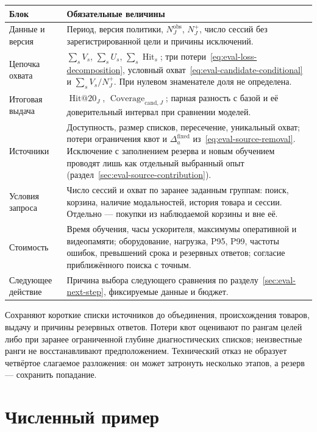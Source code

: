 \documentclass[12pt,a4paper]{article}
\theoremstyle{plainru}
\begin{document}
\begin{longtable}{L{0.25\textwidth}L{0.65\textwidth}}
\toprule Блок & Обязательные величины \\\midrule\endhead
Данные и версия & Период, версия политики, $N_J^{\mathrm{obs}}$, $N_J^+$,
число сессий без зарегистрированной цели и причины исключений. \\
Цепочка охвата & $\sum_s V_s$, $\sum_s U_s$, $\sum_s\operatorname{Hit}_s$;
три потери~\eqref{eq:eval-loss-decomposition},
условный охват~\eqref{eq:eval-candidate-conditional} и $\sum_s V_s/N_J^+$.
При нулевом знаменателе доля не определена. \\
Итоговая выдача & $\operatorname{Hit@20}_J$,
$\operatorname{Coverage}_{\mathrm{cand},J}$; парная разность с базой
и её доверительный интервал при сравнении моделей. \\
Источники & Доступность, размер списков, пересечение, уникальный охват;
потери ограничения квот и $\Delta_a^{\mathrm{fixed}}$
из~\eqref{eq:eval-source-removal}. Исключение с заполнением резерва
и новым обучением проводят лишь как отдельный выбранный опыт
(раздел~\ref{sec:eval-source-contribution}). \\
Условия запроса & Число сессий и охват по заранее заданным группам:
поиск, корзина, наличие модальностей, история товара и сессии.
Отдельно --- покупки из наблюдаемой корзины и вне её. \\
Стоимость & Время обучения, часы ускорителя, максимумы оперативной
и видеопамяти; оборудование, нагрузка, P95, P99, частоты ошибок,
превышений срока и резервных ответов; согласие приближённого поиска с точным. \\
Следующее действие & Причина выбора следующего сравнения
по разделу~\ref{sec:eval-next-step}, фиксируемые данные и бюджет. \\
\bottomrule
\end{longtable}

Сохраняют короткие списки источников до объединения, происхождения
товаров, выдачу и причины резервных ответов. Потери квот оценивают
по рангам целей либо при заранее ограниченной глубине диагностических
списков; неизвестные ранги не восстанавливают предположением.
Технический отказ не образует четвёртое слагаемое разложения:
он может затронуть несколько этапов, а резерв --- сохранить попадание.

\section{Численный пример}\label{app:example}
\end{document}

